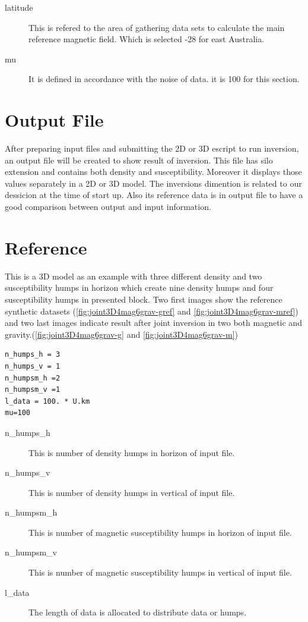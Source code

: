 \begin{description} 	
\item[latitude]This is refered to the area of gathering data sets to calculate the main reference magnetic field. Which is selected -28 for east Australia.


\item[mu]It is defined in accordance with the noise of data. it is 100 for this section.

\end{description}


\section{Output File}

After preparing input files and submitting the 2D or 3D escript to run inversion, an output file will be created to show result of inversion. This file has silo extension and contains both density and susceptibility. Moreover it displays those values separately in a 2D or 3D model. The inversions dimention is related to our dessicion at the time of start up. Also its reference data is in output file to have a good comparison between output and input information.

\section{Reference}

This is a 3D model as an example with three different density and two susceptibility humps in horizon which create nine density humps and four susceptibility humps in presented block. Two first images show the reference synthetic datasets (\ref{fig:joint3D4mag6grav-gref} and \ref{fig:joint3D4mag6grav-mref}) and two last images indicate result after joint inversion in two both magnetic and gravity.(\ref{fig:joint3D4mag6grav-g} and \ref{fig:joint3D4mag6grav-m})
 
\begin{verbatim}
n_humps_h = 3
n_humps_v = 1
n_humpsm_h =2
n_humpsm_v =1
l_data = 100. * U.km
mu=100
\end{verbatim}

\begin{description} 	
\item[n_humps_h]This is number of density humps in horizon of input file.

\item[n_humps_v]This is number of density humps in vertical of input file.

\item[n_humpsm_h]This is number of magnetic susceptibility humps in horizon of input file.

\item[n_humpsm_v]This is number of magnetic susceptibility humps in vertical of input file.

\item[l_data]The length of data is allocated to distribute data or humps.

\end{description}


